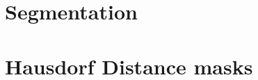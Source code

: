 % 

% 
% 
% 
% 
% 
% 
% 

% 
% 
% 
% 
% 
% 

\chapter{Segmentation}










% 

\chapter{Hausdorf Distance masks}
% 

% 
% 
% 
% 
% 
% 
% 
% 
% 
% 

